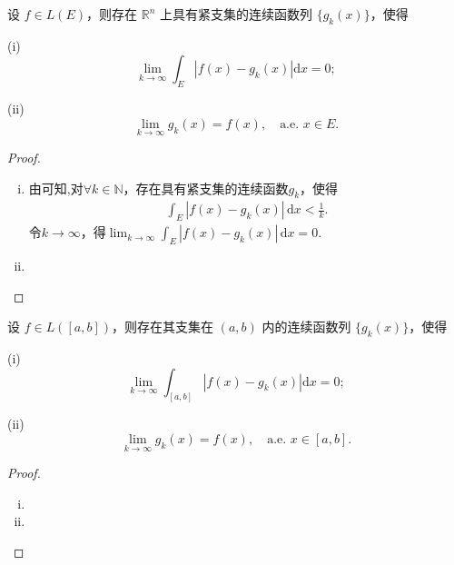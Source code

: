 \documentclass[../../main.tex]{subfiles}%
\begin{document}
\begin{corollary}
设 \( f \in L(E) \)，则存在 \( \mathbb{R}^n \) 上具有紧支集的连续函数列 \( \{ g_k(x) \} \)，使得

(i)
\[
\lim_{k \to \infty} \int_E |f(x) - g_k(x)| \mathrm{d}x = 0;
\]

(ii)
\[
\lim_{k \to \infty} g_k(x) = f(x), \quad \text{a.e. } x \in E.
\]
\end{corollary}
\begin{proof}
\begin{enumerate}[(i)]
\item 由可知,对\(\forall k \in \mathbb{N}\)，存在具有紧支集的连续函数\(g_k\)，使得
\begin{align*}
\int_E \left| f(x) - g_k(x) \right| \, \mathrm{d}x < \frac{1}{k}.
\end{align*}
令\(k \to \infty\)，得\(\lim_{k \to \infty} \int_E \left| f(x) - g_k(x) \right| \, \mathrm{d}x = 0\).

\item 
\end{enumerate}

\end{proof}

\begin{corollary}
设 \( f \in L([a,b]) \)，则存在其支集在 \( (a,b) \) 内的连续函数列 \( \{ g_k(x) \} \)，使得

(i)
\[
\lim_{k \to \infty} \int_{[a,b]} |f(x) - g_k(x)| \mathrm{d}x = 0;
\]

(ii)
\[
\lim_{k \to \infty} g_k(x) = f(x), \quad \text{a.e. } x \in [a,b].
\]
\end{corollary}
\begin{proof}
\begin{enumerate}[(i)]
\item 

\item 
\end{enumerate}

\end{proof}
\end{document}
